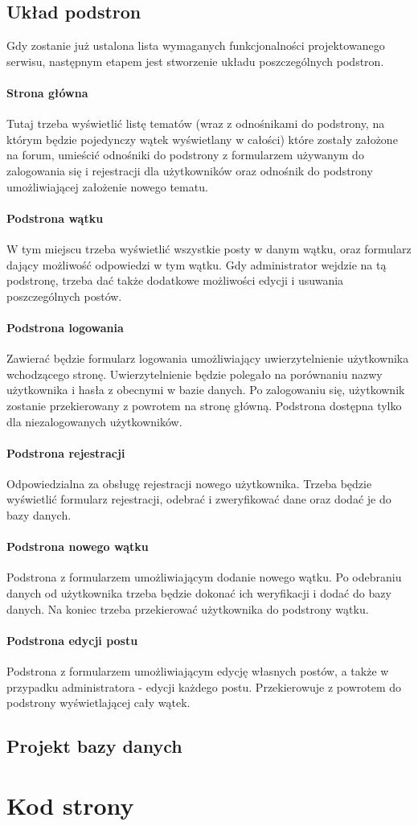 \documentclass[a4paper,10pt]{article}
\begin{document}
\subsection{Układ podstron}
Gdy zostanie już ustalona lista wymaganych funkcjonalności projektowanego serwisu, następnym etapem jest stworzenie układu poszczególnych podstron.
\paragraph{Strona główna} Tutaj trzeba wyświetlić listę tematów (wraz z odnośnikami do podstrony, na którym będzie pojedynczy wątek wyświetlany w całości) które zostały założone na forum, umieścić odnośniki do podstrony z formularzem używanym do zalogowania się i rejestracji dla użytkowników oraz odnośnik do podstrony umożliwiającej założenie nowego tematu.
\paragraph{Podstrona wątku} W tym miejscu trzeba wyświetlić wszystkie posty w danym wątku, oraz formularz dający możliwość odpowiedzi w tym wątku. Gdy administrator wejdzie na tą podstronę, trzeba dać także dodatkowe możliwości edycji i usuwania poszczególnych postów.
\paragraph{Podstrona logowania} Zawierać będzie formularz logowania umożliwiający uwierzytelnienie użytkownika wchodzącego stronę. Uwierzytelnienie będzie polegało na porównaniu nazwy użytkownika i hasła z obecnymi w bazie danych. Po zalogowaniu się, użytkownik zostanie przekierowany z powrotem na stronę główną. Podstrona dostępna tylko dla niezalogowanych użytkowników.
\paragraph{Podstrona rejestracji} Odpowiedzialna za obsługę rejestracji nowego użytkownika. Trzeba będzie wyświetlić formularz rejestracji, odebrać i zweryfikować dane oraz dodać je do bazy danych.

\paragraph{Podstrona nowego wątku} Podstrona z formularzem umożliwiającym dodanie nowego wątku. Po odebraniu danych od użytkownika trzeba będzie dokonać ich weryfikacji i dodać do bazy danych. Na koniec trzeba przekierować użytkownika do podstrony wątku.

\paragraph{Podstrona edycji postu} Podstrona z formularzem umożliwiającym edycję własnych postów, a także w przypadku administratora - edycji każdego postu. Przekierowuje z powrotem do podstrony wyświetlającej cały wątek.

\subsection{Projekt bazy danych}

\section{Kod strony}
\end{document}
